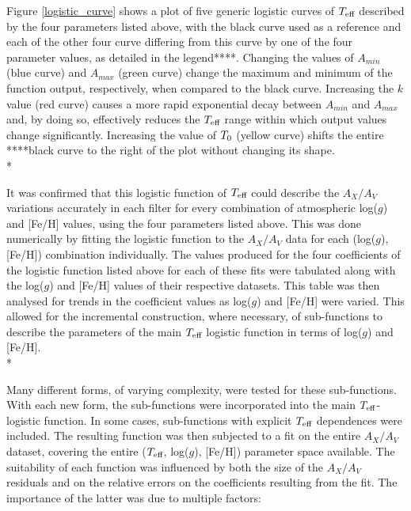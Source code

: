 \documentclass[12pt, a4paper]{report}
\begin{document}
Figure \ref{logistic_curve} shows a plot of five generic logistic curves of $T_{\textnormal{eff}}$ described by the four parameters listed above, with the black curve used as a reference and each of the other four curve differing from this curve by one of the four parameter values, as detailed in the legend****. Changing the values of $A_{min}$ (blue curve) and $A_{max}$ (green curve) change the maximum and minimum of the function output, respectively, when compared to the black curve. Increasing the $k$ value (red curve) causes a more rapid exponential decay between $A_{min}$ and $A_{max}$ and, by doing so, effectively reduces the $T_{\textnormal{eff}}$ range within which output values change significantly. Increasing the value of $T_{\textnormal{0}}$ (yellow curve) shifts the entire ****black curve to the right of the plot without changing its shape. \\*

It was confirmed that this logistic function of $T_{\textnormal{eff}}$ could describe the $A_{X}/A_{V}$ variations accurately in each filter for every combination of atmospheric log($g$) and [Fe/H] values, using the four parameters listed above. This was done numerically by fitting the logistic function to the $A_{X}/A_{V}$ data for each (log($g$),[Fe/H]) combination individually. The values produced for the four coefficients of the logistic function listed above for each of these fits were tabulated along with the log($g$) and [Fe/H] values of their respective datasets. This table was then analysed for trends in the coefficient values as log($g$) and [Fe/H] were varied. This allowed for the incremental construction, where necessary, of sub-functions to describe the parameters of the main $T_{\textnormal{eff}}$ logistic function in terms of log($g$) and [Fe/H].\\*

Many different forms, of varying complexity, were tested for these sub-functions. With each new form, the sub-functions were incorporated into the main $T_{\textnormal{eff}}$-logistic function. In some cases, sub-functions with explicit $T_{\textnormal{eff}}$ dependences were included. The resulting function was then subjected to a fit on the entire $A_{X}/A_{V}$ dataset, covering the entire ($T_{\textnormal{eff}}$,  log($g$), [Fe/H]) parameter space available. The suitability of each function was influenced by both the size of the $A_{X}/A_{V}$ residuals and on the relative errors on the coefficients resulting from the fit. The importance of the latter was due to multiple factors:
\end{document}
